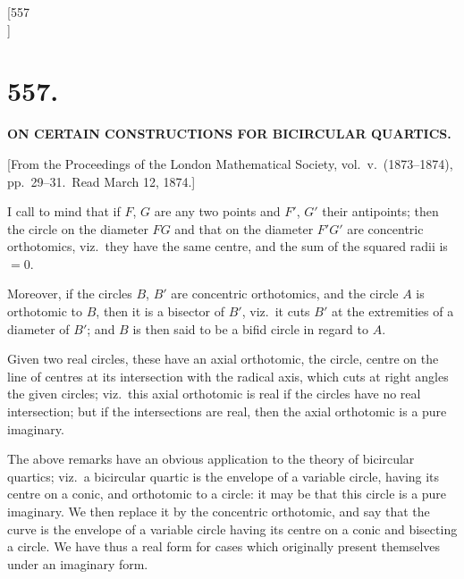 \documentclass[11pt,a4paper]{book}
\begin{document}

\newpage
\setcounter{page}{13}

\begin{center}
[557\\
]
\end{center}

\section*{\textbf{557.}}

\begin{center}
{\large \textbf{ON CERTAIN CONSTRUCTIONS FOR BICIRCULAR QUARTICS.}}
\end{center}

\begin{flushright}
{\small [From the Proceedings of the London Mathematical Society, vol.\ v.\ (1873--1874), pp.\ 29--31.\ Read March 12, 1874.]}
\end{flushright}

I call to mind that if $F$, $G$ are any two points and $F'$, $G'$ their antipoints; then the circle on the diameter $FG$ and that on the diameter $F'G'$ are concentric orthotomics, viz.\ they have the same centre, and the sum of the squared radii is $= 0$.

Moreover, if the circles $B$, $B'$ are concentric orthotomics, and the circle $A$ is orthotomic to $B$, then it is a bisector of $B'$, viz.\ it cuts $B'$ at the extremities of a diameter of $B'$; and $B$ is then said to be a bifid circle in regard to $A$.

Given two real circles, these have an axial orthotomic, the circle, centre on the line of centres at its intersection with the radical axis, which cuts at right angles the given circles; viz.\ this axial orthotomic is real if the circles have no real intersection; but if the intersections are real, then the axial orthotomic is a pure imaginary.

The above remarks have an obvious application to the theory of bicircular quartics; viz.\ a bicircular quartic is the envelope of a variable circle, having its centre on a conic, and orthotomic to a circle: it may be that this circle is a pure imaginary. We then replace it by the concentric orthotomic, and say that the curve is the envelope of a variable circle having its centre on a conic and bisecting a circle. We have thus a real form for cases which originally present themselves under an imaginary form.
\end{document}
